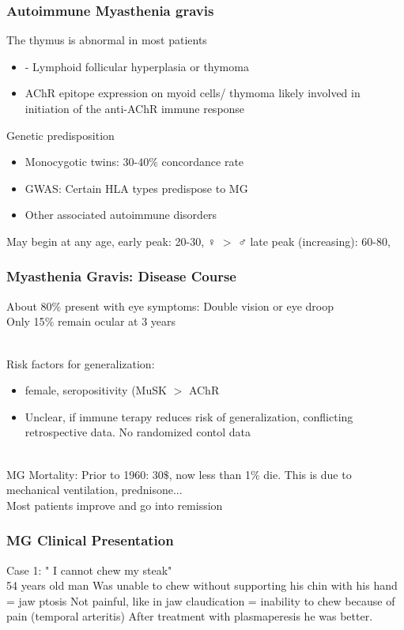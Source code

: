 \begin{itemize}
\begin{itemize}
\subsubsection{Autoimmune Myasthenia gravis}
 The thymus is abnormal in most patients
 \begin{itemize}
     \item - Lymphoid follicular hyperplasia or thymoma
\item AChR epitope expression on myoid cells/ thymoma
likely involved in initiation of the anti-AChR immune
response
 \end{itemize}
 Genetic predisposition
 \begin{itemize}
     \item Monocygotic twins: 30-40$\%$ concordance rate
\item GWAS: Certain HLA types predispose to MG
\item Other associated autoimmune disorders

 \end{itemize}

 May begin at any age, early peak: 20-30, ♀ $>$ ♂
late peak (increasing): 60-80,
\subsubsection{Myasthenia Gravis: Disease Course}
About 80$\%$ present with eye symptoms: Double vision or eye droop
\\Only 15$\%$ remain ocular at 3 years

\\Risk factors for generalization:
\begin{itemize}
    \item female, seropositivity (MuSK $>$ AChR
    \item Unclear, if immune terapy reduces risk of generalization, conflicting retrospective data. No randomized contol data
\end{itemize}

\\MG Mortality: Prior to 1960: 30$\$$, now less than 1$\%$ die. This is due to mechanical ventilation, prednisone...
\\Most patients improve and go into remission

\subsubsection{MG Clinical Presentation}
Case 1: " I cannot chew my steak"
\\54 years old man
Was unable to chew without
supporting his chin with his
hand = jaw ptosis
Not painful, like in jaw
claudication = inability to
chew because of pain
(temporal arteritis)
After treatment with plasmaperesis he was better.

\end{itemize}
\end{itemize}
